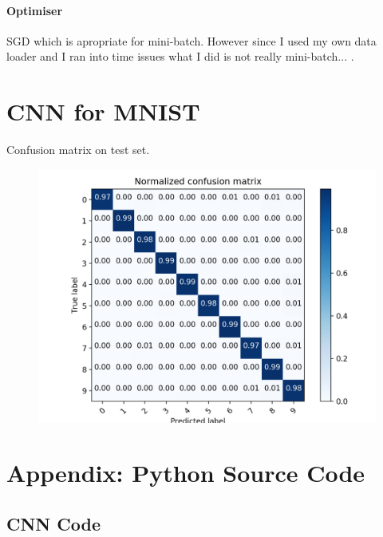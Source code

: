 \documentclass[11pt,a4paper,twoside]{article}
\begin{document}
\paragraph{Optimiser} SGD which is apropriate for mini-batch. However since I used my own data loader and I ran into time issues what I did is not really mini-batch... .



\section{CNN for MNIST}
Confusion matrix on test set.
\begin{figure}[!h]
	\centering
	\includegraphics[width=.8\textwidth]{confusionMat}
	\label{gauss1}
\end{figure}


\FloatBarrier

\newpage
\section{Appendix: Python Source Code}
\label{sec:app}

\subsection{CNN Code}

\end{document}
